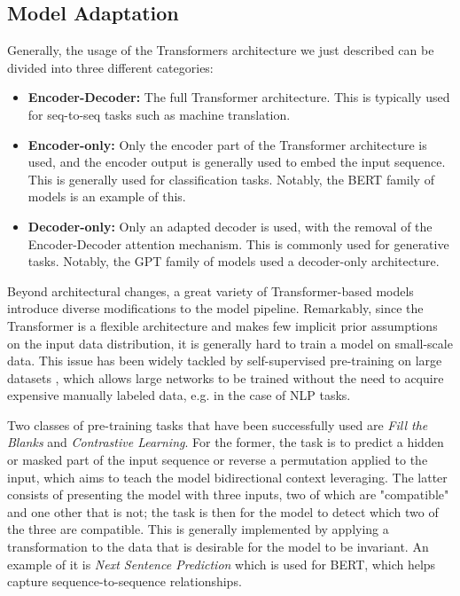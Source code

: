 \subsection{Model Adaptation}

Generally, the usage of the Transformers architecture we just described can be divided into three different categories:
\begin{itemize}
    \item \textbf{Encoder-Decoder:} The full Transformer architecture. This is typically used for seq-to-seq tasks such as machine translation. 
    \item \textbf{Encoder-only:} Only the encoder part of the Transformer architecture is used, and the encoder output is generally used to embed the input sequence. This is generally used for classification tasks. Notably, the BERT \cite{devlin2019bert} family of models is an example of this.
    \item \textbf{Decoder-only:} Only an adapted decoder is used, with the removal of the Encoder-Decoder attention mechanism. This is commonly used for generative tasks. Notably, the GPT \cite{brown2020language} family of models used a decoder-only architecture.
\end{itemize}

Beyond architectural changes, a great variety of Transformer-based models introduce diverse modifications to the model pipeline. Remarkably, since the Transformer is a flexible architecture and makes few implicit prior assumptions on the input data distribution, it is generally hard to train a model on small-scale data. This issue has been widely tackled by self-supervised pre-training on large datasets \cite{devlin2019bert}\cite{brown2020language}, which allows large networks to be trained without the need to acquire expensive manually labeled data, e.g. in the case of NLP tasks. 

Two classes of pre-training tasks that have been successfully used are \textit{Fill the Blanks} and \textit{Contrastive Learning}. For the former, the task is to predict a hidden or masked part of the input sequence or reverse a permutation applied to the input, which aims to teach the model bidirectional context leveraging. The latter consists of presenting the model with three inputs, two of which are "compatible" and one other that is not; the task is then for the model to detect which two of the three are compatible. This is generally implemented by applying a transformation to the data that is desirable for the model to be invariant. An example of it is \textit{Next Sentence Prediction} which is used for BERT, which helps capture sequence-to-sequence relationships. 

